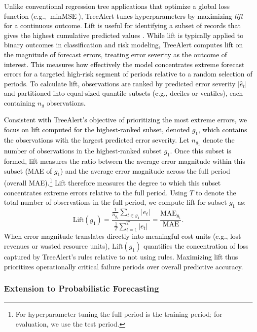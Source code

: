 \documentclass[]{interact}
\theoremstyle{plain}
\theoremstyle{definition}
\theoremstyle{remark}
\newcommand{\matt}[1]{\textcolor{black}{#1}}
\begin{document}
\matt{Unlike conventional regression tree applications that optimize a global loss function
(e.g., $\min \text{MSE}$), TreeAlert tunes hyperparameters by maximizing \emph{lift} for a
continuous outcome. Lift is useful for identifying a subset of records that gives the highest
cumulative predicted values \citep{shmueli2024machine}. While lift is typically applied to
binary outcomes in classification and risk modeling, TreeAlert computes lift on the magnitude
of forecast errors, treating error severity as the outcome of interest. This measures how
effectively the model concentrates extreme forecast errors for a targeted high-risk segment
of periods relative to a random selection of periods. To calculate lift, observations are
ranked by predicted error severity $|\hat{e}_t|$ and partitioned into equal-sized quantile
subsets (e.g., deciles or ventiles), each containing $n_g$ observations.}

\matt{Consistent with TreeAlert's objective of prioritizing the most extreme errors, we
focus on lift computed for the highest-ranked subset, denoted $g_{1}$, which contains the
observations with the largest predicted error severity. Let $n_{g_1}$ denote the number of
observations in the highest-ranked subset $g_{1}$. Once this subset is formed, lift measures
the ratio between the average error magnitude within this subset (MAE of $g_1$) and the
average error magnitude across the full period (overall MAE).\footnote{For hyperparameter
tuning the full period is the training period; for evaluation, we use the test period.} Lift
therefore measures the degree to which this subset concentrates extreme errors relative to
the full period. Using $T$ to denote the total number of observations in the full period, we
compute lift for subset $g_{1}$ as:
\begin{equation}
\text{Lift}(g_{1}) =
\frac{
\displaystyle \frac{1}{n_{g_1}}\sum_{t\in {g_1}} |e_t|
}{
\displaystyle \frac{1}{T}\sum_{t=1}^{T} |e_t|
} = \frac{\text{MAE}_{g_1}}{\text{MAE}}.
\end{equation}
When error magnitude translates directly into meaningful cost units (e.g., lost revenues or
wasted resource units), $\text{Lift}(g_1)$ quantifies the concentration of loss captured by
TreeAlert's rules relative to not using rules. Maximizing lift thus prioritizes operationally
critical failure periods over overall predictive accuracy.}

\subsubsection{Extension to Probabilistic Forecasting}
\end{document}
